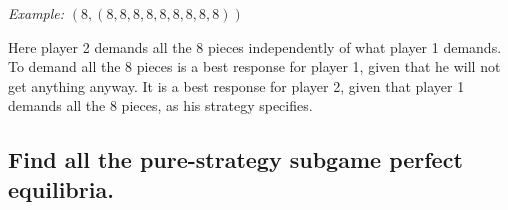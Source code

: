 \documentclass{article}
\begin{document}
\begin{mdframed}[backgroundcolor=blue!20,linecolor=white]
\textit{Example:} $(8, (8,8,8,8,8,8,8,8,8))$

Here player 2 demands all the 8 pieces independently of what player 1 demands. 
To demand all the 8 pieces is a best response for player 1, given that he will not get anything anyway. 
It is a best response for player 2, given that player 1 demands all the 8 pieces, as his strategy specifies.

\end{mdframed}

%
\subsection{Find all the pure-strategy subgame perfect equilibria.}
\label{subsec:spne}
\end{document}
